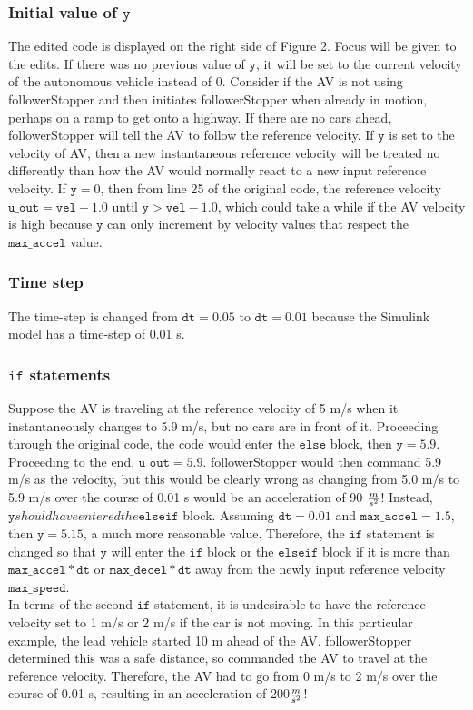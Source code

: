 \documentclass[12pt, letterpaper]{article}
\newcommand{\tab}{\hspace*{2em}}
\begin{document}
\subsubsection{Initial value of $\mathtt{y}$}
The edited code is displayed on the right side of Figure 2. Focus will be given to the edits. If there was no previous value of $\mathtt{y}$, it will be set to the current velocity of the autonomous vehicle instead of 0. Consider if the AV is not using followerStopper and then initiates followerStopper when already in motion, perhaps on a ramp to get onto a highway. If there are no cars ahead, followerStopper will tell the AV to follow the reference velocity. If $\mathtt{y}$ is set to the velocity of AV, then a new instantaneous reference velocity will be treated no differently than how the AV would normally react to a new input reference velocity. If $\mathtt{y}=0$, then from line 25 of the original code, the reference velocity $\mathtt{u\_out=vel-1.0}$ until $\mathtt{y>vel-1.0}$, which could take a while if the AV velocity is high because $\mathtt{y}$ can only increment by velocity values that respect the $\mathtt{max\_accel}$ value.
\subsubsection{Time step}
The time-step is changed from $\mathtt{dt=0.05}$ to $\mathtt{dt=0.01}$ because the Simulink model has a time-step of 0.01 s.
\subsubsection{$\mathtt{if}$ statements}
Suppose the AV is traveling at the reference velocity of 5 m/s when it instantaneously changes to 5.9 m/s, but no cars are in front of it. Proceeding through the original code, the code would enter the $\mathtt{else}$ block, then $\mathtt{y=5.9}$. Proceeding to the end, $\mathtt{u\_out=5.9}$. followerStopper would then command 5.9 m/s as the velocity, but this would be clearly wrong as changing from 5.0 m/s to 5.9 m/s over the course of 0.01 s would be an acceleration of 90 $m\over s^2$! Instead, $\mathtt{y} should have entered the \mathtt{elseif}$ block. Assuming $\mathtt{dt=0.01}$ and $\mathtt{max\_accel=1.5}$, then $\mathtt{y=5.15}$, a much more reasonable value. Therefore, the $\mathtt{if}$ statement is changed so that $\mathtt{y}$ will enter the $\mathtt{if}$ block or the $\mathtt{elseif}$ block if it is more than $\mathtt{max\_accel*dt}$ or  $\mathtt{max\_decel*dt}$ away from the  newly input reference velocity $\mathtt{max\_speed}$. \\
\tab In terms of the second  $\mathtt{if}$ statement, it is undesirable to have the reference velocity set to 1 m/s or 2 m/s if the car is not moving. In this particular example, the lead vehicle started 10 m ahead of the AV. followerStopper determined this was a safe distance, so commanded the AV to travel at the reference velocity. Therefore, the AV had to go from 0 m/s to 2 m/s over the course of 0.01 s, resulting in an acceleration of 200$m\over s^2$!
\end{document}
